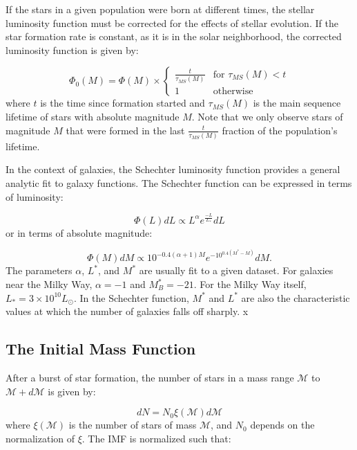 If the stars in a given population were born at different times, the stellar luminosity function must be corrected for the effects of stellar evolution. If the star formation rate is constant, as it is in the solar neighborhood,  the corrected luminosity function is given by:

 \begin{equation}
\Phi_0(M) = \Phi(M) \times
\begin{cases}
\frac{t}{\tau_{MS}(M)} & \text{for } \tau_{MS}(M)<t \\
1 & \text{otherwise}
\end{cases}
\end{equation} 
where $t$ is the time since formation started and $\tau_{MS}(M)$ is the main sequence lifetime of stars with absolute magnitude $M$. Note that we only observe stars of magnitude $M$ that were formed in the last $\frac{t}{\tau_{MS}(M)}$ fraction of the population's lifetime.

In the context of galaxies, the Schechter luminosity function provides a general analytic fit to galaxy functions. The Schechter function can be expressed in terms of luminosity:

\begin{equation}
\Phi(L) dL \propto L^\alpha  e^{\frac{-L}{L_*}} dL
\end{equation}
or in terms of absolute magnitude:

\begin{equation}
\Phi(M) dM \propto 10^{-0.4(\alpha+1)M} e^{-10^{0.4(M^*-M)}} dM.
 \end{equation}
 The parameters $\alpha$, $L^*$, and $M^*$ are usually fit to a given dataset. For galaxies near the Milky Way, $\alpha = -1$ and $M^*_B = -21$. For the Milky Way itself, $L_* = 3\times 10^{10} L_\odot$. In the Schechter function, $M^*$ and $L^*$ are also the characteristic values at which the number of galaxies falls off sharply. x 

\subsection{The Initial Mass Function}

After a burst of star formation, the number of stars in a mass range $\mathcal{M}$ to $\mathcal{M}+d\mathcal{M}$ is given by:

\begin{equation}
dN = N_0 \xi(\mathcal{M}) d\mathcal{M}
\end{equation}
where $\xi(\mathcal{M})$ is the number of stars of mass $\mathcal{M}$, and $N_0$ depends on the normalization of $\xi$. The IMF is normalized such that:

